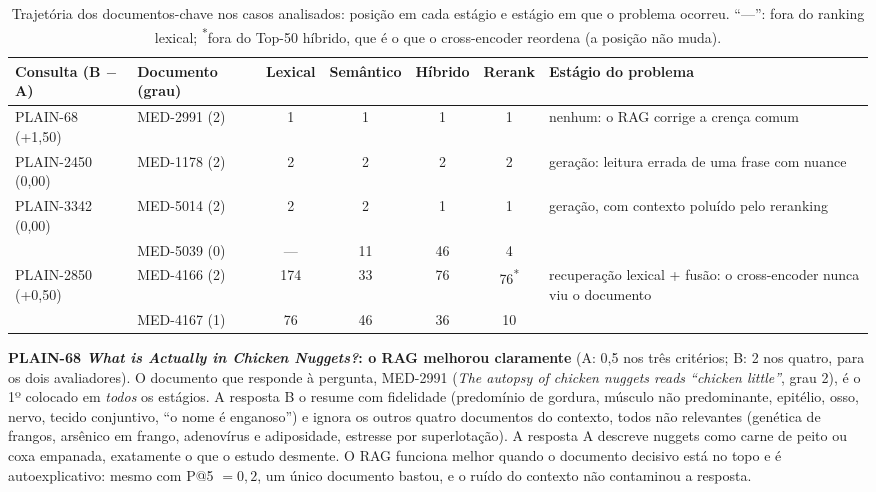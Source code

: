 \documentclass[10pt,a4paper]{article}
\newcommand{\med}[1]{\mbox{MED-#1}}         %
\newcommand{\pq}[1]{\mbox{PLAIN-#1}}        %
\begin{document}
\begin{table}[!htb]
\centering\small
\caption{Trajetória dos documentos-chave nos casos analisados: posição em cada estágio e estágio em que o problema ocorreu. ``---'': fora do ranking lexical; \textsuperscript{*}fora do Top-50 híbrido, que é o que o cross-encoder reordena (a posição não muda).}
\label{tab:casosrag}
\begin{tabularx}{\linewidth}{@{}l l c c c c >{\raggedright\arraybackslash}X@{}}
\toprule
Consulta (B $-$ A) & Documento (grau) & Lexical & Semântico & Híbrido & Rerank & Estágio do problema \\
\midrule
\pq{68} (+1,50)   & \med{2991} (2) & 1 & 1 & 1 & 1 & nenhum: o RAG corrige a crença comum \\
\addlinespace
\pq{2450} (0,00)  & \med{1178} (2) & 2 & 2 & 2 & 2 & geração: leitura errada de uma frase com nuance \\
\addlinespace
\pq{3342} (0,00)  & \med{5014} (2) & 2 & 2 & 1 & 1 & geração, com contexto poluído pelo reranking \\
                  & \med{5039} (0) & --- & 11 & 46 & 4 & \\
\addlinespace
\pq{2850} (+0,50) & \med{4166} (2) & 174 & 33 & 76 & 76\textsuperscript{*} & recuperação lexical + fusão: o cross-encoder nunca viu o documento \\
                  & \med{4167} (1) & 76 & 46 & 36 & 10 & \\
\bottomrule
\end{tabularx}
\end{table}

\textbf{\pq{68} \emph{What is Actually in Chicken Nuggets?}: o RAG melhorou claramente} (A: 0,5 nos três critérios; B: 2 nos quatro, para os dois avaliadores). O documento que responde à pergunta, \med{2991} (\emph{The autopsy of chicken nuggets reads ``chicken little''}, grau 2), é o 1º colocado em \emph{todos} os estágios. A resposta B o resume com fidelidade (predomínio de gordura, músculo não predominante, epitélio, osso, nervo, tecido conjuntivo, ``o nome é enganoso'') e ignora os outros quatro documentos do contexto, todos não relevantes (genética de frangos, arsênico em frango, adenovírus e adiposidade, estresse por superlotação). A resposta A descreve nuggets como carne de peito ou coxa empanada, exatamente o que o estudo desmente. O RAG funciona melhor quando o documento decisivo está no topo e é autoexplicativo: mesmo com P@5 $= 0{,}2$, um único documento bastou, e o ruído do contexto não contaminou a resposta.
\end{document}
